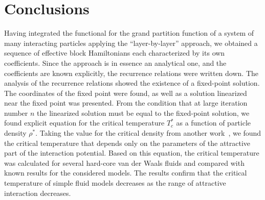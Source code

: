 \section{Conclusions}
Having integrated the functional for the grand partition function of a system of many interacting particles applying the ``layer-by-layer'' approach, we obtained a sequence of effective block Hamiltonians each characterized by its own coefficients. Since the approach is in essence an analytical one, and the coefficients are known explicitly, the recurrence relations were written down. The analysis of the recurrence relations showed the existence of a fixed-point solution. The coordinates of the fixed point were found, as well as a solution linearized near the fixed point was presented. From the condition that at large iteration number $n$ the linearized solution must be equal to the fixed-point solution, we found explicit equation for the critical temperature $T^*_c$ as a function of particle density $\rho^*$. Taking the value for the critical density from another work~\cite{YukhJSP1995}, we found the critical temperature that depends only on the parameters of the attractive part of the interaction potential. Based on this equation, the critical temperature was calculated for several hard-core van der Waals fluids and compared with known results for the considered models. The results confirm that the critical temperature of simple fluid models decreases as the range of attractive interaction decreases.